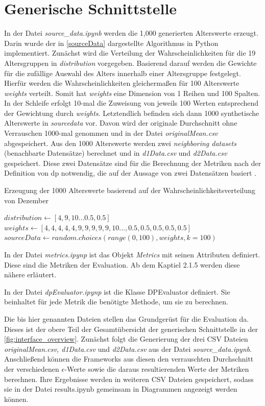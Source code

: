 \section{Generische Schnittstelle}
In der Datei \textit{source\_data.ipynb} werden die 1,000 generierten Alterswerte erzeugt. Darin wurde der in \cref{sourceData} dargestellte Algorithmus in Python implementiert. Zunächst wird die Verteilung der Wahrscheinlichkeiten für die 19 Altersgruppen in \textit{distribution} vorgegeben. Basierend darauf werden die Gewichte für die zufällige Auswahl des Alters innerhalb einer Altersgruppe festgelegt. Hierfür werden die Wahrscheinlichkeiten gleichermaßen für 100 Alterswerte \textit{weights} verteilt. Somit hat \textit{weights} eine Dimension von 1 Reihen und 100 Spalten. In der Schleife erfolgt 10-mal die Zuweisung von jeweils 100 Werten entsprechend der Gewichtung durch \textit{weights}. Letztendlich befinden sich dann 1000 synthetische Alterswerte in \textit{sourcedata} vor. Davon wird der originale Durchschnitt ohne Verrauschen 1000-mal genommen und in der Datei \textit{originalMean.csv} abgespeichert. Aus den 1000 Alterswerte werden zwei \textit{neighboring datasets} (benachbarte Datensätze) berechnet und in \textit{d1Data.csv} und \textit{d2Data.csv} gespeichert. Diese zwei Datensätze sind für die Berechnung der Metriken nach der Definition von \gls{dp} notwendig, die auf der Aussage von zwei Datensätzen basiert \parencite{Dwork2006}.
\begin{algorithm}[htbp]
	\caption{Erzeugung der 1000 Alterswerte basierend auf der Wahrscheinlichkeitsverteilung von Dezember}\label{sourceData}
	\begin{algorithmic}[1]
		\State $distribution \gets [4,9,10 ... 0.5,0.5]$
		\State $weights \gets [4,4,4,4,4,9,9,9,9,9,10 ... ,0.5,0.5,0.5,0.5,0.5]$
		\State $sourceData\gets random.choices(range(0,100),
		weights, k=100)$	
		\EndFor
	\end{algorithmic}
\end{algorithm}

In der Datei \textit{metrics.ipynp} ist das Objekt \textit{Metrics} mit seinen Attributen definiert. Diese sind die Metriken der Evaluation. Ab dem Kaptiel 2.1.5 werden diese nähere erläutert.

In der Datei \textit{dpEvaluator.ipynp} ist die Klasse DPEvaluator definiert. Sie beinhaltet für jede Metrik die benötigte Methode, um sie zu berechnen.

Die bis hier genannten Dateien stellen das Grundgerüst für die Evaluation da. Dieses ist der obere Teil der Gesamtübersicht der generischen Schnittstelle in der \cref{fig:interface_overview}. Zunächst folgt die Generierung der drei CSV Dateien \textit{originalMean.csv, d1Data.csv} und \textit{d2Data.csv} aus der Datei \textit{source\_data.ipynb}. Anschließend können die Frameworks aus diesen den verrauschten Durchschnitt der verschiedenen $\epsilon$-Werte sowie die daraus resultierenden Werte der Metriken berechnen. Ihre Ergebnisse werden in weiteren CSV Dateien gespeichert, sodass sie in der Datei results.ipynb gemeinsam in Diagrammen angezeigt werden können.


